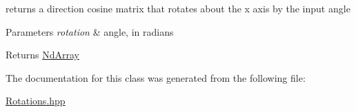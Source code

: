 returns a direction cosine matrix that rotates about the x axis by the input angle


\begin{DoxyParams}{Parameters}
{\em rotation} & angle, in radians \\
\hline
\end{DoxyParams}
\begin{DoxyReturn}{Returns}
\mbox{\hyperlink{class_num_c_1_1_nd_array}{Nd\+Array}} 
\end{DoxyReturn}


The documentation for this class was generated from the following file\+:\begin{DoxyCompactItemize}
\item 
\mbox{\hyperlink{_rotations_8hpp}{Rotations.\+hpp}}\end{DoxyCompactItemize}
